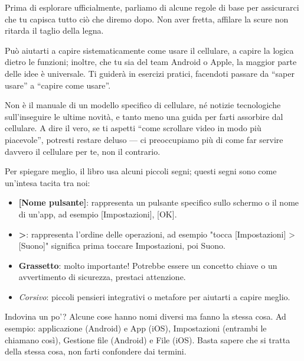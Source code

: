 
Prima di esplorare ufficialmente, parliamo di alcune regole di base per assicurarci che tu capisca tutto ciò che diremo dopo. Non aver fretta, affilare la scure non ritarda il taglio della legna.


Può aiutarti a capire sistematicamente come usare il cellulare, a capire la logica dietro le funzioni; inoltre, che tu sia del team Android o Apple, la maggior parte delle idee è universale. Ti guiderà in esercizi pratici, facendoti passare da “saper usare” a “capire come usare”.

Non è il manuale di un modello specifico di cellulare, né notizie tecnologiche sull'inseguire le ultime novità, e tanto meno una guida per farti assorbire dal cellulare. A dire il vero, se ti aspetti “come scrollare video in modo più piacevole”, potresti restare deluso — ci preoccupiamo più di come far servire davvero il cellulare per te, non il contrario.


Per spiegare meglio, il libro usa alcuni piccoli segni; questi segni sono come un'intesa tacita tra noi:

\begin{itemize}
  \item \textbf{[Nome pulsante]}: rappresenta un pulsante specifico sullo schermo o il nome di un'app, ad esempio [Impostazioni], [OK].
  \item \textbf{>}: rappresenta l'ordine delle operazioni, ad esempio "tocca [Impostazioni] > [Suono]" significa prima toccare Impostazioni, poi Suono.
  \item \textbf{Grassetto}: molto importante! Potrebbe essere un concetto chiave o un avvertimento di sicurezza, prestaci attenzione.
  \item \emph{Corsivo}: piccoli pensieri integrativi o metafore per aiutarti a capire meglio.
\end{itemize}


Indovina un po'? Alcune cose hanno nomi diversi ma fanno la stessa cosa. Ad esempio: applicazione (Android) e App (iOS), Impostazioni (entrambi le chiamano così), Gestione file (Android) e File (iOS). Basta sapere che si tratta della stessa cosa, non farti confondere dai termini.

